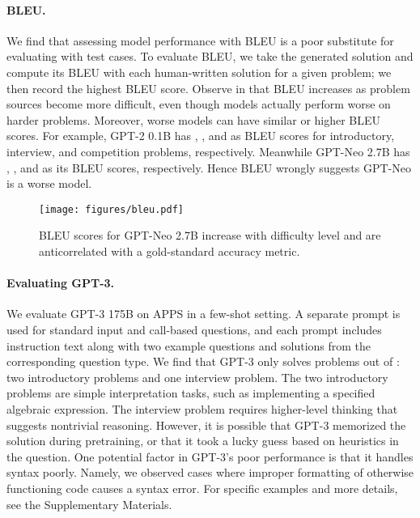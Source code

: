 \documentclass{article}
\begin{document}
\paragraph{BLEU.} We find that assessing model performance with BLEU is a poor substitute for evaluating with test cases. To evaluate BLEU, we take the generated solution and compute its BLEU with each human-written solution for a given problem; we then record the highest BLEU score. Observe in  that BLEU increases as problem sources become more difficult, even though models actually perform worse on harder problems. Moreover, worse models can have similar or higher BLEU scores. For example, GPT-2 0.1B has , , and  as BLEU scores for introductory, interview, and competition problems, respectively. Meanwhile GPT-Neo 2.7B has , , and  as its BLEU scores, respectively. Hence BLEU wrongly suggests GPT-Neo is a worse model. 











\begin{wrapfigure}{r}{0.5\textwidth}
    \centering
    \texttt{[image: figures/bleu.pdf]}
    \caption{BLEU scores for GPT-Neo 2.7B increase with difficulty level and are anticorrelated with a gold-standard accuracy metric.}
    \label{fig:bleu}
\end{wrapfigure}

\paragraph{Evaluating GPT-3.}
We evaluate GPT-3 175B on APPS in a few-shot setting. A separate prompt is used for standard input and call-based questions, and each prompt includes instruction text along with two example questions and solutions from the corresponding question type. We find that GPT-3 only solves  problems out of : two introductory problems and one interview problem. The two introductory problems are simple interpretation tasks, such as implementing a specified algebraic expression. The interview problem requires higher-level thinking that suggests nontrivial reasoning. However, it is possible that GPT-3 memorized the solution during pretraining, or that it took a lucky guess based on heuristics in the question. One potential factor in GPT-3's poor performance is that it handles syntax poorly. Namely, we observed cases where improper formatting of otherwise functioning code causes a syntax error. For specific examples and more details, see the Supplementary Materials.
\end{document}
